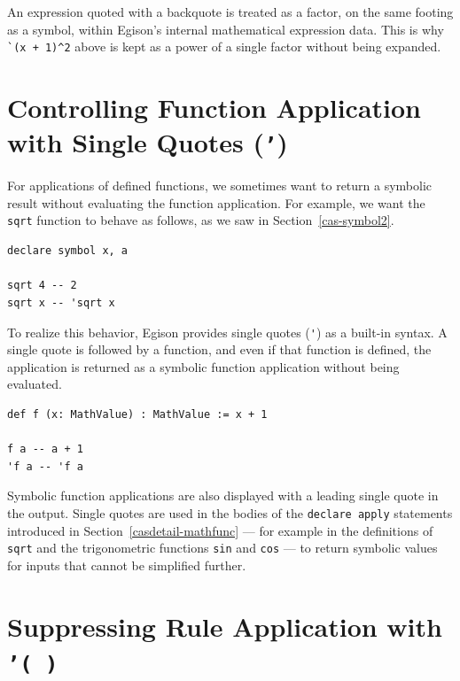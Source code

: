 An expression quoted with a backquote is treated as a factor, on the same footing as a symbol, within Egison's internal mathematical expression data.
This is why \lstinline{`(x + 1)^2} above is kept as a power of a single factor without being expanded.

\section{Controlling Function Application with Single Quotes (\texttt{'})}\label{mexpr-squote}

For applications of defined functions, we sometimes want to return a symbolic result without evaluating the function application.
For example, we want the \lstinline{sqrt} function to behave as follows, as we saw in Section~\ref{cas-symbol2}.
\begin{lstlisting}[language=egison,numbers=none]
declare symbol x, a

sqrt 4 -- 2
sqrt x -- 'sqrt x
\end{lstlisting}
To realize this behavior, Egison provides single quotes (\lstinline{'}) as a built-in syntax.
A single quote is followed by a function, and even if that function is defined, the application is returned as a symbolic function application without being evaluated.
\begin{lstlisting}[language=egison,numbers=none]
def f (x: MathValue) : MathValue := x + 1

f a -- a + 1
'f a -- 'f a
\end{lstlisting}
Symbolic function applications are also displayed with a leading single quote in the output.
Single quotes are used in the bodies of the \lstinline{declare apply} statements introduced in Section~\ref{casdetail-mathfunc} --- for example in the definitions of \lstinline{sqrt} and the trigonometric functions \lstinline{sin} and \lstinline{cos} --- to return symbolic values for inputs that cannot be simplified further.

\section{Suppressing Rule Application with \texttt{'( )}}\label{mexpr-rsquote}

